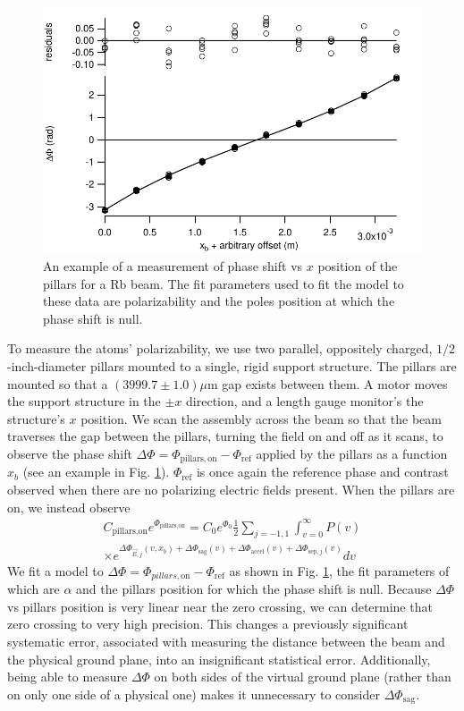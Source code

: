 \documentclass[twocolumn,prl,showpacs,superscriptaddress]{revtex4-1}   %
\newcommand{\figref}[1]{Fig. \ref{#1}}
\newcommand{\dphisepj}{\Delta\Phi_{\mathrm{sep},j}}
\newcommand{\dphisag}{\Delta\Phi_{\mathrm{sag}}}
\newcommand{\dphiaccel}{\Delta\Phi_{\mathrm{accel}}}
\begin{document}
\begin{figure}
\includegraphics[width=\linewidth,keepaspectratio]{dPvMP_150327_q.pdf}
\caption{\label{dPvMPExample}An example of a measurement of phase shift vs $x$ position of the pillars for a Rb beam. The fit parameters used to fit the model to these data are polarizability and the poles position at which the phase shift is null.}
\end{figure}

To measure the atoms' polarizability, we use two parallel, oppositely charged, $1/2$-inch-diameter pillars mounted to a single, rigid support structure. The pillars are mounted so that a $(3999.7 \pm 1.0)\mu$m gap exists between them. A motor moves the support structure in the $\pm x$ direction, and a length gauge monitor's the structure's $x$ position. We scan the assembly across the beam so that the beam traverses the gap between the pillars, turning the field on and off as it scans, to observe the phase shift $\Delta\Phi = \Phi_{\mathrm{pillars,on}} - \Phi_{\mathrm{ref}}$ applied by the pillars as a function $x_b$ (see an example in \figref{dPvMPExample}). $\Phi_{\mathrm{ref}}$ is once again the reference phase and contrast observed when there are no polarizing electric fields present.
When the pillars are on, we instead observe
\begin{align}
	C_{\textrm{pillars,on}}e^{\Phi_{\textrm{pillars,on}}} = 
		C_0e^{\Phi_0}		
		\frac{1}{2} \sum_{j=-1,1}
		\int_{v=0}^{\infty} P(v) \nonumber \\ \times
		e^{
			\Delta\Phi_{\vec{E},j}(v,x_b) + 
			\dphisag(v) + \dphiaccel(v) + \dphisepj(v)
		} 
		dv
	\label{CPPolesEOn}
\end{align}
We fit a model to $\Delta\Phi = \Phi_{pillars,\mathrm{on}} - \Phi_{\mathrm{ref}}$ as shown in \figref{dPvMPExample}, the fit parameters of which are $\alpha$ and the pillars position for which the phase shift is null. Because $\Delta\Phi$ vs pillars position is very linear near the zero crossing, we can determine that zero crossing to very high precision. 
This changes a previously significant systematic error, associated with measuring the distance between the beam and the physical ground plane, into an insignificant statistical error.
Additionally, being able to measure $\Delta\Phi$ on both sides of the virtual ground plane (rather than on only one side of a physical one) makes it unnecessary to consider $\dphisag$. 
\end{document}
